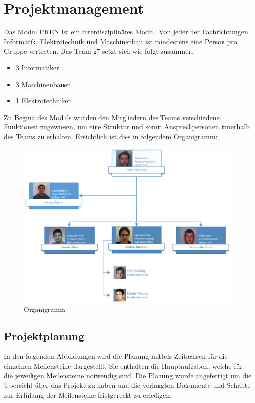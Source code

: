\section{Projektmanagement}
Das Modul PREN ist ein interdisziplinäres Modul. Von jeder der Fachrichtungen Informatik, Elektrotechnik und Maschinenbau ist mindestens eine Person pro Gruppe vertreten. Das Team 27 setzt sich wie folgt zusammen:
\begin{itemize}
	\item 3 Informatiker
	\item 3 Maschinenbauer
	\item 1 Elektrotechniker
\end{itemize}
Zu Beginn des Moduls wurden den Mitgliedern des Teams verschiedene Funktionen zugewiesen, um eine Struktur und somit Ansprechpersonen innerhalb des Teams zu erhalten. Ersichtlich ist dies in folgendem Organigramm:
\begin{figure}[h!]
	\centering
	\includegraphics[width=1.0\textwidth]{fig/Organigramm.png}
	\caption{Organigramm}
	\label{fig:Organigramm}
\end{figure}

\subsection{Projektplanung}
In den folgenden Abbildungen wird die Planung mittels Zeitachsen für die einzelnen Meilensteine dargestellt. Sie enthalten die Hauptaufgaben, welche für die jeweiligen Meilensteine notwendig sind. Die Planung wurde angefertigt um die Übersicht über das Projekt zu haben und die verlangten Dokumente und Schritte zur Erfüllung der Meilensteine fristgerecht zu erledigen.

